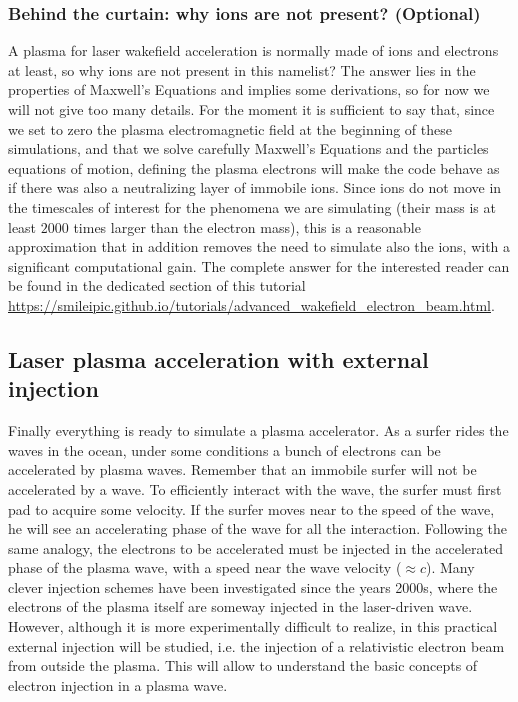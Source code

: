 \documentclass[a4paper,12pt]{extarticle}
\begin{document}
\subsubsection*{Behind the curtain: why ions are not present? (Optional)} A plasma for laser wakefield acceleration is normally made of ions and electrons at least, so why ions are not present in this namelist? The answer lies in the properties of Maxwell's Equations and implies some derivations, so for now we will not give too many details. For the moment it is sufficient to say that, since we set to zero the plasma electromagnetic field at the beginning of these simulations, and that we solve carefully Maxwell's Equations and the particles equations of motion, defining the plasma electrons will make the code behave as if there was also a neutralizing layer of immobile ions. Since ions do not move in the timescales of interest for the phenomena we are simulating (their mass is at  least $2000$ times larger than the electron mass), this is a reasonable approximation that in addition removes the need to simulate also the ions, with a significant computational gain. The complete answer for the interested reader can be found in the dedicated section of this tutorial \url{https://smileipic.github.io/tutorials/advanced_wakefield_electron_beam.html}.

\subsection{Laser plasma acceleration with external injection}
Finally everything is ready to simulate a plasma accelerator. As a surfer rides the waves in the ocean,  under some conditions a bunch of electrons can be accelerated by plasma waves. Remember that an immobile surfer will not be accelerated by a wave. To efficiently interact with the wave, the surfer must first pad to acquire some velocity. If the surfer moves near to the speed of the wave, he will see an accelerating phase of the wave for all the interaction.
Following the same analogy,  the electrons to be accelerated must be injected in the accelerated phase of the plasma wave, with a speed near the wave velocity  ($\approx c$). Many clever injection schemes have been investigated since  the years 2000s, where the electrons of the plasma itself are someway injected in the laser-driven wave. However, although it is more experimentally difficult to realize, in this practical external injection will be studied, i.e. the injection of a relativistic electron beam from outside the plasma. This will allow to understand the basic concepts of electron injection in a plasma wave. \\
\end{document}
